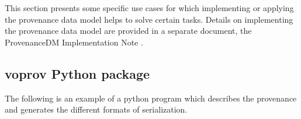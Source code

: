%

This section presents some specific use cases for which implementing or applying the  provenance data model helps to solve certain tasks. Details on implementing the provenance data model are provided in a separate document, the ProvenanceDM Implementation Note \citep{std:ProvenanceImplementationNote}.

\subsection{voprov Python package}\label{sec:implementation_voprov}
The following is an example of a python program which describes the provenance and generates the different formats of serialization.
